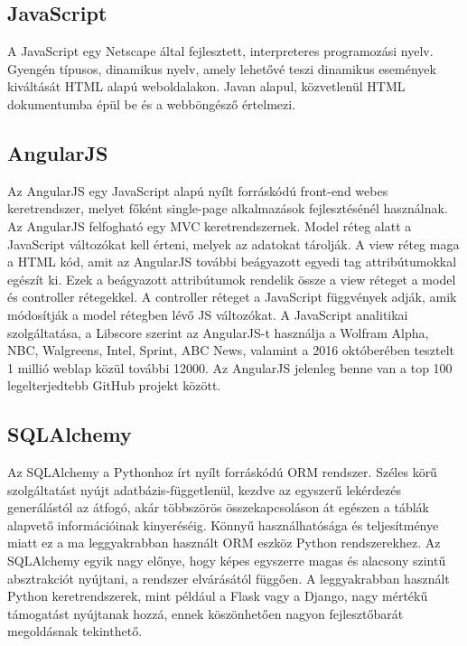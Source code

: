 \subsection{JavaScript}

A JavaScript egy Netscape által fejlesztett, interpreteres programozási nyelv. Gyengén típusos, dinamikus nyelv, amely lehetővé teszi dinamikus események kiváltását HTML alapú weboldalakon. Javan alapul, közvetlenül HTML dokumentumba épül be és a webböngésző értelmezi.

\subsection{AngularJS}

Az AngularJS egy JavaScript alapú nyílt forráskódú front-end webes keretrendszer, melyet főként single-page alkalmazások fejlesztésénél használnak. Az AngularJS felfogható egy MVC keretrendszernek. Model réteg alatt a JavaScript változókat kell érteni, melyek az adatokat tárolják. A view réteg maga a HTML kód, amit az AngularJS további beágyazott egyedi tag attribútumokkal egészít ki. Ezek a beágyazott attribútumok rendelik össze a view réteget a model és controller rétegekkel. A controller réteget a JavaScript függvények adják, amik módosítják a model rétegben lévő JS változókat.
A JavaScript analitikai szolgáltatása, a Libscore szerint az AngularJS-t használja a Wolfram Alpha, NBC, Walgreens, Intel, Sprint, ABC News, valamint a 2016 októberében tesztelt 1 millió weblap közül további 12000. Az AngularJS jelenleg benne van a top 100 legelterjedtebb GitHub projekt között.

\subsection{SQLAlchemy}

Az SQLAlchemy a Pythonhoz írt nyílt forráskódú ORM rendszer. Széles körű szolgáltatást nyújt adatbázis-függetlenül, kezdve az egyszerű lekérdezés generálástól az átfogó, akár többszörös összekapcsoláson át egészen a táblák alapvető információinak kinyeréséig. Könnyű használhatósága és teljesítménye miatt ez a ma leggyakrabban használt ORM eszköz Python rendszerekhez. 
Az SQLAlchemy egyik nagy előnye, hogy képes egyszerre magas és alacsony szintű absztrakciót nyújtani, a rendszer elvárásától függően. A leggyakrabban használt Python keretrendszerek, mint például a Flask vagy a Django, nagy mértékű támogatást nyújtanak hozzá, ennek köszönhetően nagyon fejlesztőbarát megoldásnak tekinthető.

